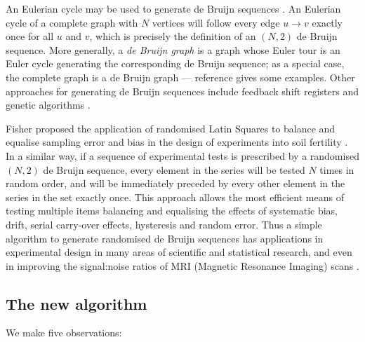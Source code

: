 \documentclass[12pt]{article}
\begin{document}
An Eulerian cycle may be used to generate de Bruijn sequences \cite{fleury,hierholzer}. An Eulerian cycle of a complete graph with $N$ vertices will follow every edge $u \rightarrow v$ exactly once for all $u$ and $v$, which is precisely the definition of an $(N,2)$ de Bruijn sequence. More generally, a \emph{de Bruijn graph\/} is a graph whose Euler tour is an Euler cycle generating the corresponding de Bruijn sequence; as a special case, the complete graph is a de Bruijn graph --- reference \cite{good} gives some examples. Other approaches for generating de Bruijn sequences include feedback shift registers and genetic algorithms \cite{turan,knuth4a}.%

Fisher proposed the application of randomised Latin Squares to balance and equalise sampling error and bias in the design of experiments into soil fertility \cite{fisher}. 
In a similar way, if a sequence of experimental tests is prescribed by a randomised $(N,2)$ de Bruijn sequence, every element in the series will be tested $N$ times in random order, and will be immediately preceded by every other element in the series in the set exactly once. This approach allows the most efficient means of testing multiple items balancing and equalising the effects of systematic bias, drift, serial carry-over effects, hysteresis and random error. Thus a simple algorithm to generate randomised de Bruijn sequences has applications in experimental design in many areas of scientific and statistical research, and even in improving the signal:noise ratios of MRI (Magnetic Resonance Imaging) scans \cite{aguirre}.

\subsection{The new algorithm}

\def\pair#1#2{\ifx #1#2
#1\rightarrow #2 %
\else #1\rightarrow#2\rightarrow#1\fi}

We make five observations:
\end{document}
